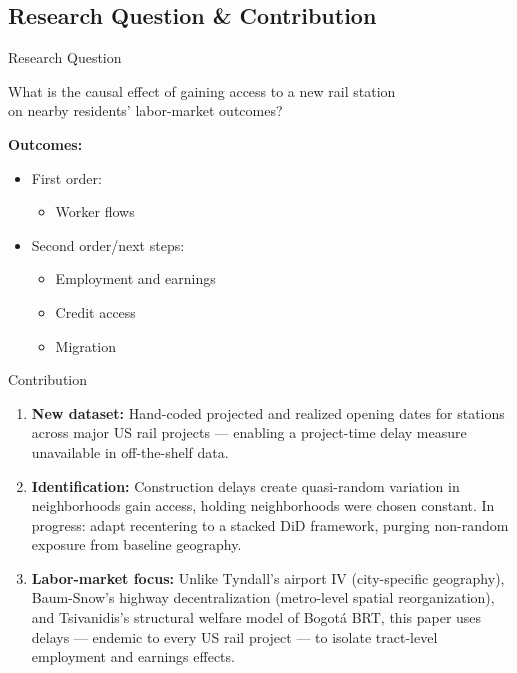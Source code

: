 \subsection{Research Question \& Contribution}
\begin{frame}[label=rq]{Research Question}
\begin{center}
\large
What is the causal effect of gaining access to a new rail station \\
on nearby residents' labor-market outcomes?
\end{center}
\bigskip\bigskip
\textbf{Outcomes:}
\begin{itemize}
    \item First order:
    \begin{itemize}
      \item Worker flows
    \end{itemize}
    \item Second order/next steps:
    \begin{itemize}
      \item Employment and earnings
      \item Credit access
      \item Migration
    \end{itemize}
\end{itemize}
\end{frame}
\begin{frame}[label=contribution]{Contribution}
\small
\begin{enumerate}
  \item \textbf{New dataset:} Hand-coded projected and realized opening dates for stations
        across major US rail projects --- enabling a project-time delay measure unavailable
        in off-the-shelf data.
  \item \textbf{Identification:} Construction delays create quasi-random variation in
         neighborhoods gain access, holding  neighborhoods were
        chosen constant. In progress: adapt \textcite{borusyakNonrandomExposureExogenous2023}
        recentering to a stacked DiD framework, purging non-random exposure from baseline
        geography.
  \item \textbf{Labor-market focus:} Unlike Tyndall's airport IV (city-specific geography),
        Baum-Snow's highway decentralization (metro-level spatial reorganization), and
        Tsivanidis's structural welfare model of Bogotá BRT, this paper uses delays ---
        endemic to every US rail project --- to isolate tract-level employment and earnings effects.
\end{enumerate}
\end{frame}
